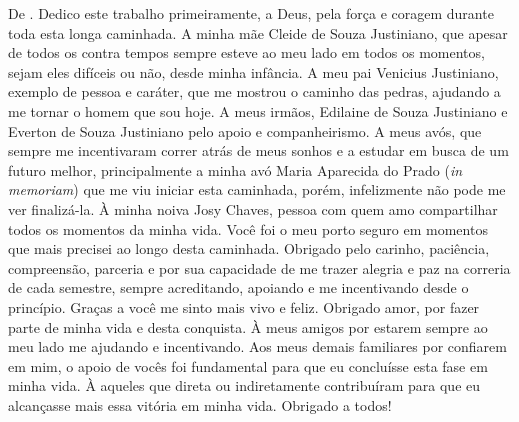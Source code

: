 \begin{dedicatoria}
\vspace*{\fill}
De \imprimirAutorDois.
\newline
Dedico este trabalho primeiramente, a Deus, pela força e coragem durante toda esta longa caminhada. A minha mãe Cleide de Souza Justiniano, que apesar de todos os contra tempos sempre esteve ao meu lado em todos os momentos, sejam eles difíceis ou não, desde minha infância. A meu pai Venicius Justiniano, exemplo de pessoa e caráter, que me mostrou o caminho das pedras, ajudando a me tornar o homem que sou hoje. A meus irmãos, Edilaine de Souza Justiniano e Everton de Souza Justiniano pelo apoio e companheirismo. A meus avós, que sempre me incentivaram correr atrás de meus sonhos e a estudar em busca de um futuro melhor, principalmente a minha avó Maria Aparecida do Prado (\textit{in memoriam}) que me viu iniciar esta caminhada, porém, infelizmente não pode me ver finalizá-la. À minha noiva Josy Chaves, pessoa com quem amo compartilhar todos os momentos da minha vida. Você foi o meu porto seguro em momentos que mais precisei ao longo desta caminhada. Obrigado pelo carinho, paciência, compreensão, parceria e por sua capacidade de me trazer alegria e paz na correria de cada semestre, sempre acreditando, apoiando e me incentivando desde o princípio. Graças a você me sinto mais vivo e feliz. Obrigado amor, por fazer parte de minha vida e desta conquista. À meus amigos por estarem sempre ao meu lado me ajudando e incentivando. Aos meus demais familiares por confiarem em mim, o apoio de vocês foi fundamental para que eu concluísse esta fase em minha vida. À aqueles que direta ou indiretamente contribuíram para que eu alcançasse mais essa vitória em minha vida. Obrigado a todos!
\end{dedicatoria}
